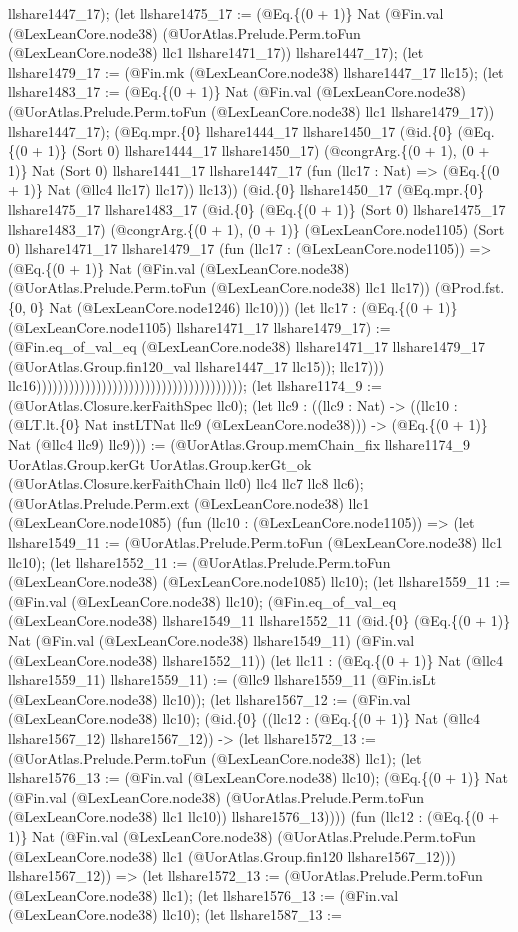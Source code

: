 \documentclass[11pt]{article}
\begin{document}
llshare1447\_17); (let llshare1475\_17 := (@Eq.\{(0 + 1)\} Nat (@Fin.val (@LexLeanCore.node38) (@UorAtlas.Prelude.Perm.toFun (@LexLeanCore.node38) llc1 llshare1471\_17)) llshare1447\_17); (let llshare1479\_17 := (@Fin.mk (@LexLeanCore.node38) llshare1447\_17 llc15); (let llshare1483\_17 := (@Eq.\{(0 + 1)\} Nat (@Fin.val (@LexLeanCore.node38) (@UorAtlas.Prelude.Perm.toFun (@LexLeanCore.node38) llc1 llshare1479\_17)) llshare1447\_17); (@Eq.mpr.\{0\} llshare1444\_17 llshare1450\_17 (@id.\{0\} (@Eq.\{(0 + 1)\} (Sort 0) llshare1444\_17 llshare1450\_17) (@congrArg.\{(0 + 1), (0 + 1)\} Nat (Sort 0) llshare1441\_17 llshare1447\_17 (fun (llc17 : Nat) => (@Eq.\{(0 + 1)\} Nat (@llc4 llc17) llc17)) llc13)) (@id.\{0\} llshare1450\_17 (@Eq.mpr.\{0\} llshare1475\_17 llshare1483\_17 (@id.\{0\} (@Eq.\{(0 + 1)\} (Sort 0) llshare1475\_17 llshare1483\_17) (@congrArg.\{(0 + 1), (0 + 1)\} (@LexLeanCore.node1105) (Sort 0) llshare1471\_17 llshare1479\_17 (fun (llc17 : (@LexLeanCore.node1105)) => (@Eq.\{(0 + 1)\} Nat (@Fin.val (@LexLeanCore.node38) (@UorAtlas.Prelude.Perm.toFun (@LexLeanCore.node38) llc1 llc17)) (@Prod.fst.\{0, 0\} Nat (@LexLeanCore.node1246) llc10))) (let llc17 : (@Eq.\{(0 + 1)\} (@LexLeanCore.node1105) llshare1471\_17 llshare1479\_17) := (@Fin.eq\_of\_val\_eq (@LexLeanCore.node38) llshare1471\_17 llshare1479\_17 (@UorAtlas.Group.fin120\_val llshare1447\_17 llc15)); llc17))) llc16)))))))))))))))))))))))))))))))))))))); (let llshare1174\_9 := (@UorAtlas.Closure.kerFaithSpec llc0); (let llc9 : ((llc9 : Nat) -> ((llc10 : (@LT.lt.\{0\} Nat instLTNat llc9 (@LexLeanCore.node38))) -> (@Eq.\{(0 + 1)\} Nat (@llc4 llc9) llc9))) := (@UorAtlas.Group.memChain\_fix llshare1174\_9 UorAtlas.Group.kerGt UorAtlas.Group.kerGt\_ok (@UorAtlas.Closure.kerFaithChain llc0) llc4 llc7 llc8 llc6); (@UorAtlas.Prelude.Perm.ext (@LexLeanCore.node38) llc1 (@LexLeanCore.node1085) (fun (llc10 : (@LexLeanCore.node1105)) => (let llshare1549\_11 := (@UorAtlas.Prelude.Perm.toFun (@LexLeanCore.node38) llc1 llc10); (let llshare1552\_11 := (@UorAtlas.Prelude.Perm.toFun (@LexLeanCore.node38) (@LexLeanCore.node1085) llc10); (let llshare1559\_11 := (@Fin.val (@LexLeanCore.node38) llc10); (@Fin.eq\_of\_val\_eq (@LexLeanCore.node38) llshare1549\_11 llshare1552\_11 (@id.\{0\} (@Eq.\{(0 + 1)\} Nat (@Fin.val (@LexLeanCore.node38) llshare1549\_11) (@Fin.val (@LexLeanCore.node38) llshare1552\_11)) (let llc11 : (@Eq.\{(0 + 1)\} Nat (@llc4 llshare1559\_11) llshare1559\_11) := (@llc9 llshare1559\_11 (@Fin.isLt (@LexLeanCore.node38) llc10)); (let llshare1567\_12 := (@Fin.val (@LexLeanCore.node38) llc10); (@id.\{0\} ((llc12 : (@Eq.\{(0 + 1)\} Nat (@llc4 llshare1567\_12) llshare1567\_12)) -> (let llshare1572\_13 := (@UorAtlas.Prelude.Perm.toFun (@LexLeanCore.node38) llc1); (let llshare1576\_13 := (@Fin.val (@LexLeanCore.node38) llc10); (@Eq.\{(0 + 1)\} Nat (@Fin.val (@LexLeanCore.node38) (@UorAtlas.Prelude.Perm.toFun (@LexLeanCore.node38) llc1 llc10)) llshare1576\_13)))) (fun (llc12 : (@Eq.\{(0 + 1)\} Nat (@Fin.val (@LexLeanCore.node38) (@UorAtlas.Prelude.Perm.toFun (@LexLeanCore.node38) llc1 (@UorAtlas.Group.fin120 llshare1567\_12))) llshare1567\_12)) => (let llshare1572\_13 := (@UorAtlas.Prelude.Perm.toFun (@LexLeanCore.node38) llc1); (let llshare1576\_13 := (@Fin.val (@LexLeanCore.node38) llc10); (let llshare1587\_13 := 
\end{document}
